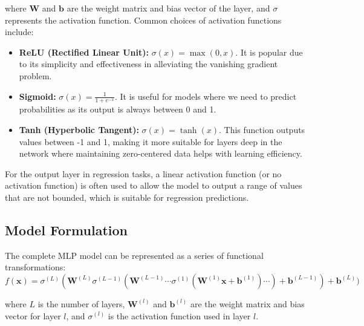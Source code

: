 \documentclass[12pt]{article}
\begin{document}
where $\mathbf{W}$ and $\mathbf{b}$ are the weight matrix and bias vector of the layer, and $\sigma$ represents the activation function. Common choices of activation functions include:
\begin{itemize}
    \item \textbf{ReLU (Rectified Linear Unit):} $\sigma(x) = \max(0, x)$. It is popular due to its simplicity and effectiveness in alleviating the vanishing gradient problem.
    \item \textbf{Sigmoid:} $\sigma(x) = \frac{1}{1 + e^{-x}}$. It is useful for models where we need to predict probabilities as its output is always between 0 and 1.
    \item \textbf{Tanh (Hyperbolic Tangent):} $\sigma(x) = \tanh(x)$. This function outputs values between -1 and 1, making it more suitable for layers deep in the network where maintaining zero-centered data helps with learning efficiency.
\end{itemize}

For the output layer in regression tasks, a linear activation function (or no activation function) is often used to allow the model to output a range of values that are not bounded, which is suitable for regression predictions.

\subsection{Model Formulation}
The complete MLP model can be represented as a series of functional transformations:
\begin{equation}
f(\mathbf{x}) = \sigma^{(L)}(\mathbf{W}^{(L)} \sigma^{(L-1)}(\mathbf{W}^{(L-1)} \cdots \sigma^{(1)}(\mathbf{W}^{(1)}\mathbf{x} + \mathbf{b}^{(1)}) \cdots) + \mathbf{b}^{(L-1)}) + \mathbf{b}^{(L)})
\end{equation}

where $L$ is the number of layers, $\mathbf{W}^{(l)}$ and $\mathbf{b}^{(l)}$ are the weight matrix and bias vector for layer $l$, and $\sigma^{(l)}$ is the activation function used in layer $l$.
\end{document}
